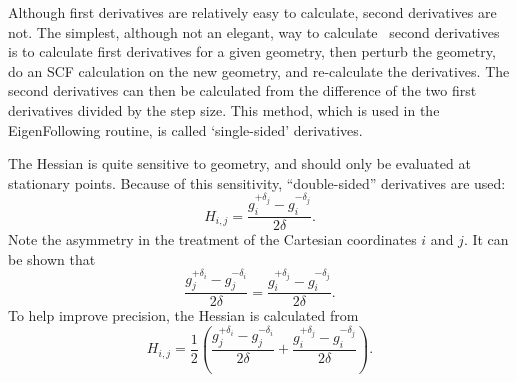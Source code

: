 Although first derivatives are relatively easy to calculate, second derivatives
are not.  The simplest, although not an elegant, way to calculate~\cite{pulayf}
second derivatives is to calculate first derivatives for a given geometry, then
perturb the geometry, do an SCF calculation on the new geometry, and
re-calculate the derivatives. The second derivatives can then be calculated
from the difference of the two first derivatives divided by the step size. 
This method, which is used in the EigenFollowing routine, is called
`single-sided' derivatives.

The Hessian is quite sensitive to geometry, and should only be evaluated at
stationary points.  Because of this sensitivity, ``double-sided'' derivatives
 are used:
$$
H_{i,j} = \frac{g_i^{+\delta_j}-g_i^{-\delta_j}}{2\delta}.
$$
Note the asymmetry in the treatment of the Cartesian coordinates $i$ and $j$.
It can be shown that 
$$
\frac{g_j^{+\delta_i}-g_j^{-\delta_i}}{2\delta} = \frac{g_i^{+\delta_j}-g_i^{-\delta_j}}{2\delta}.
$$
To help improve precision, the Hessian is calculated from
$$
H_{i,j} = \frac{1}{2}\left ( \frac{g_j^{+\delta_i}-g_j^{-\delta_i}}{2\delta} + \frac{g_i^{+\delta_j}-g_i^{-\delta_j}}{2\delta} \right ).
$$
